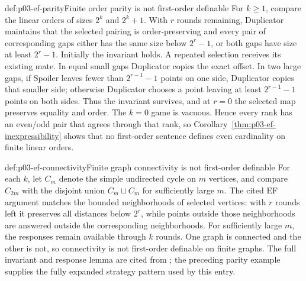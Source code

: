 \begin{hbexample}{def:p03-ef-parity}{Finite order parity is not first-order definable}
For \(k\geq1\), compare the linear orders of sizes \(2^k\) and \(2^k+1\).
With \(r\) rounds remaining, Duplicator maintains that the selected pairing is
order-preserving and every pair of corresponding gaps either has the same size
below \(2^r-1\), or both gaps have size at least \(2^r-1\).  Initially the
invariant holds.  A repeated selection receives its existing mate.  In equal
small gaps Duplicator copies the exact offset.
In two large gaps, if Spoiler leaves fewer than \(2^{r-1}-1\) points on one
side, Duplicator copies that smaller side; otherwise Duplicator chooses a point
leaving at least \(2^{r-1}-1\) points on both sides.  Thus the invariant
survives, and at \(r=0\) the selected map preserves equality and order.  The
\(k=0\) game is vacuous.  Hence every rank has an even/odd pair that agrees
through that rank, so Corollary~\ref{thm:p03-ef-inexpressibility} shows that no
first-order sentence defines even cardinality on finite linear orders.
\end{hbexample}

\begin{hbexample}{def:p03-ef-connectivity}{Finite graph connectivity is not first-order definable}
For each \(k\), let \(C_m\) denote the simple undirected cycle on \(m\)
vertices, and compare \(C_{2m}\) with the disjoint union \(C_m\sqcup C_m\)
for sufficiently large \(m\).  The cited EF argument matches the bounded
neighborhoods of selected vertices: with \(r\) rounds left it preserves all
distances below \(2^r\), while points outside those neighborhoods are answered
outside the corresponding neighborhoods.  For sufficiently large \(m\), the
responses remain available through \(k\) rounds.  One graph is connected and
the other is not, so connectivity is not first-order definable on finite
graphs.  The full invariant and response lemma are cited from
\cite{Libkin2004}; the preceding parity example supplies the fully expanded
strategy pattern used by this entry.
\end{hbexample}
